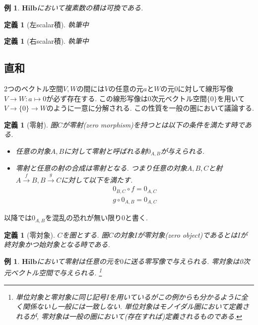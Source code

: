 \documentclass[a4paper,12pt]{ltjsarticle}
\theoremstyle{break}
\newtheorem{defn}[thm]{定義}
\newtheorem{eg}[thm]{例}
\newcommand{\hilb}{\mathbf{Hilb}}
\newcommand{\xr}[1]{\xrightarrow{#1}}
\newcommand{\ci}{\circ}
\newcommand{\mt}{\mapsto}
\numberwithin{equation}{section}
\begin{document}
\begin{eg}
  $\hilb$において複素数の積は可換である. 
\end{eg} 

\begin{defn}[左scalar積]
  執筆中
\end{defn}

\begin{defn}[右scalar積]
  執筆中
\end{defn}

\subsection{直和}

2つのベクトル空間$V,W$の間には$V$の任意の元$a$と$W$の元$0$に対して線形写像$V \to W: a\mt 0$が必ず存在する. 
この線形写像は0次元ベクトル空間$\{ 0 \}$を用いて$V \to \{0\} \to W$のように一意に分解される. 
この性質を一般の圏において議論する. 

\begin{defn}[零射]
  圏$C$が零射(zero morphism)を持つとは以下の条件を満たす時である. 
  \begin{itemize}
    \item 任意の対象$A,B$に対して零射と呼ばれる射$0_{A,B}$が与えられる.
    \item 零射と任意の射の合成は零射となる. 
    つまり任意の対象$A,B,C$と射$A \xr{f} B, B \xr{g} C$に対して以下を満たす. 
    \begin{align*}
      0_{B,C} \ci f = 0_{A,C} \\
      g \ci 0_{A,B} = 0_{A,C}
    \end{align*}
  \end{itemize}
\end{defn}

以降では$0_{A,B}$を混乱の恐れが無い限り$0$と書く. 

\begin{defn}[零対象]
  $C$を圏とする. 
  圏$C$の対象$I$が零対象(zero object)であるとは$I$が終対象かつ始対象となる時である. 
\end{defn}

\begin{eg}
  $\hilb$において零射は任意の元を$0$に送る零写像で与えられる. 
  零対象は0次元ベクトル空間で与えられる. 
  \footnote{
    単位対象と零対象に同じ記号$I$を用いているがこの例からも分かるように全く関係ないし一般には一致しない. 
    単位対象はモノイダル圏において定義されるが, 零対象は一般の圏において(存在すれば)定義されるものである. 
  }
\end{eg}
\end{document}
